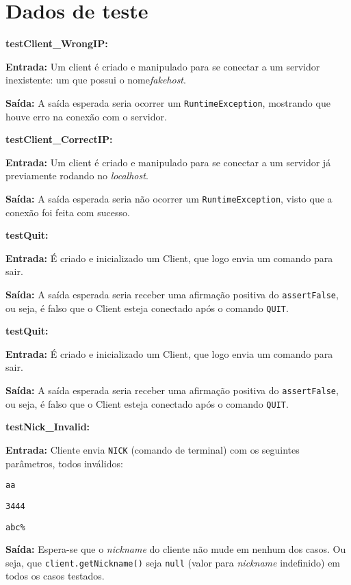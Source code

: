 \section{Dados de teste}

\newcommand{\teste}[3]{
    \item\textbf{#1:}
    \begin{itemise}
        \item\textbf{Entrada: } #2
        \item\textbf{Saída: }   #3
    \end{itemise}
}

\begin{itemise}

\teste
    {testClient\_WrongIP}
    {Um client é criado e manipulado para se conectar a um servidor inexistente:
    um que possui o nome\emph{fakehost}.}
    {A saída esperada seria ocorrer um \texttt{RuntimeException}, mostrando que
    houve erro na conexão com o servidor.}

\teste
    {testClient\_CorrectIP}
    {Um client é criado e manipulado para se conectar a um servidor já previamente
    rodando no \emph{localhost}.}
    {A saída esperada seria não ocorrer um \texttt{RuntimeException}, visto que a
    conexão foi feita com sucesso.}

\teste
    {testQuit}
    {É criado e inicializado um Client, que logo envia um comando para sair.}
    {A saída esperada seria receber uma afirmação positiva do \texttt{assertFalse},
    ou seja, é falso que o Client esteja conectado após o comando \texttt{QUIT}.}

\teste
    {testQuit}
    {É criado e inicializado um Client, que logo envia um comando para sair.}
    {A saída esperada seria receber uma afirmação positiva do \texttt{assertFalse},
    ou seja, é falso que o Client esteja conectado após o comando \texttt{QUIT}.}
    
\teste
    {testNick\_Invalid}
    {Cliente envia \texttt{NICK} (comando de terminal) com os seguintes parâmetros,
    todos inválidos:
        \begin{itemise}
            \item \texttt{aa}
            \item \texttt{3444}
            \item \texttt{abc\%}
        \end{itemise}
    }
    {Espera-se que o \emph{nickname} do cliente não mude em nenhum dos casos. Ou
    seja, que \texttt{client.getNickname()} seja \texttt{null} (valor para
    \emph{nickname} indefinido) em todos os casos testados.}


\end{itemise}
